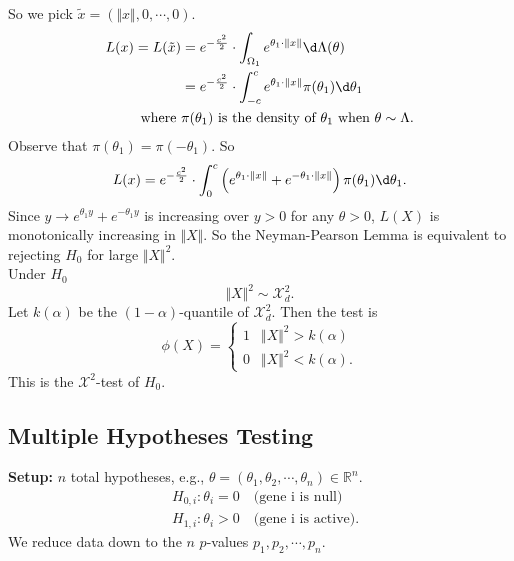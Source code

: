 \documentclass[a4paper]{article}
\begin{document}
\begin{eg}
\begin{answer}
\begin{center}
		\end{center}
		So we pick $\tilde{x} = (\Vert x \Vert,0,\cdots,0)$.
		\begin{equation*}
			\begin{aligned}
				L(x) = L(\tilde{x}) &= e^{-\frac{c^2}{2}} \cdot \int_{\Omega_1}e^{\theta_1 \cdot \Vert x \Vert} \d \Lambda(\theta) \\
				&= e^{-\frac{c^2}{2}} \cdot \int_{-c}^{c}e^{\theta_1 \cdot \Vert x \Vert} \pi(\theta_1)\d \theta_1 \\
				\text{ where } &\pi(\theta_1) \text{ is the density of $\theta_1$ when } \theta \sim \Lambda.
			\end{aligned}
		\end{equation*}
		Observe that $\pi(\theta_1) = \pi(-\theta_1)$. So
		\begin{equation}
			L(x) = e^{-\frac{c^2}{2}} \cdot \int_0^c\left(e^{\theta_1 \cdot \Vert x \Vert} + e^{-\theta_1 \cdot \Vert x \Vert}\right) \pi(\theta_1) \d \theta_1.
		\end{equation}
		Since $y \to e^{\theta_1 y} + e^{-\theta_1 y}$ is increasing over $y > 0$ for any $\theta > 0$, $L(X)$ is monotonically increasing in $\Vert X \Vert$. So the Neyman-Pearson Lemma is equivalent to rejecting $H_0$ for large $\Vert X \Vert^2$.\\
		\newline
		Under $H_0$
		\begin{equation*}
			\Vert X \Vert^2 \sim \mathcal{X}_d^2.
		\end{equation*}
		Let $k(\alpha)$ be the $(1-\alpha)$-quantile of $\mathcal{X}_d^2$. Then the test is
		\begin{equation}
			\phi(X) = \left\{
			\begin{array}{ll}
				1 & \Vert X \Vert^2 > k(\alpha) \\
				0 & \Vert X \Vert^2 < k(\alpha).
			\end{array}
			\right.
		\end{equation}
		This is the $\mathcal{X}^2$-test of $H_0$.
	\end{answer}
\end{eg}

\subsection{Multiple Hypotheses Testing}
\textbf{Setup:} $n$ total hypotheses, e.g., $\theta = (\theta_1,\theta_2,\cdots,\theta_n) \in \mathbb{R}^n$.
\begin{equation*}
	\begin{aligned}
		& H_{0,i}: \theta_i = 0 \quad \text{(gene i is null)} \\
		& H_{1,i}: \theta_i > 0 \quad \text{(gene i is active)}.
	\end{aligned}
\end{equation*}
We reduce data down to the $n$ $p$-values $p_1,p_2,\cdots,p_n$.\\
\end{document}
